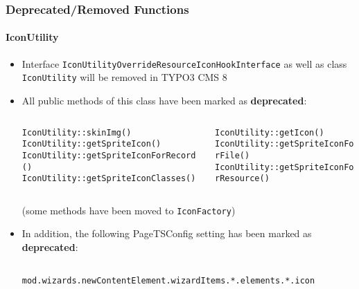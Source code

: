 \begin{frame}[fragile]
	\frametitle{Deprecated/Removed Functions}
	\framesubtitle{IconUtility}


	\begin{itemize}

		\item Interface \texttt{IconUtilityOverrideResourceIconHookInterface}\newline
			as well as class \texttt{IconUtility} will be removed in TYPO3 CMS 8

		\item All public methods of this class have been marked as \textbf{deprecated}:

		\vspace{0.2cm}

		\begin{columns}[T]
			\begin{column}{.5\textwidth}
				\tiny
					\tabto{1cm}\texttt{IconUtility::skinImg()}\newline
					\tabto{1cm}\texttt{IconUtility::getSpriteIcon()}\newline
					\tabto{1cm}\texttt{IconUtility::getSpriteIconForRecord()}\newline
					\tabto{1cm}\texttt{IconUtility::getSpriteIconClasses()}
			\end{column}
			\begin{column}{.5\textwidth}
				\vspace{-0.18cm}\tiny
					\texttt{IconUtility::getIcon()}\newline
					\texttt{IconUtility::getSpriteIconForFile()}\newline
					\texttt{IconUtility::getSpriteIconForResource()}\newline
			\end{column}
		\end{columns}

		\vspace{0.2cm}
		\normalsize

			\small
				(some methods have been moved to \texttt{IconFactory})
			\normalsize

		\item In addition, the following PageTSConfig setting has been marked as \textbf{deprecated}:

			\begin{lstlisting}
				mod.wizards.newContentElement.wizardItems.*.elements.*.icon
			\end{lstlisting}

	\end{itemize}

\end{frame}

